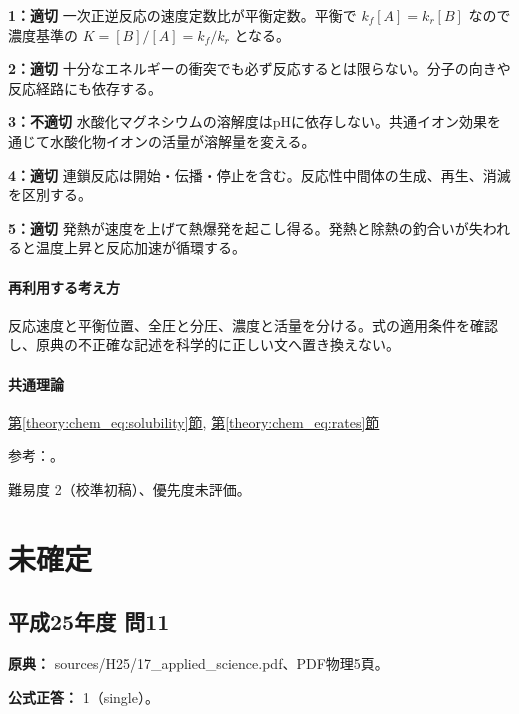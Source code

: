 \noindent\textbf{1：適切} 一次正逆反応の速度定数比が平衡定数。平衡で \(k_f[A]=k_r[B]\) なので濃度基準の \(K=[B]/[A]=k_f/k_r\) となる。\par

\noindent\textbf{2：適切} 十分なエネルギーの衝突でも必ず反応するとは限らない。分子の向きや反応経路にも依存する。\par

\noindent\textbf{3：不適切} 水酸化マグネシウムの溶解度はpHに依存しない。共通イオン効果を通じて水酸化物イオンの活量が溶解量を変える。\par

\noindent\textbf{4：適切} 連鎖反応は開始・伝播・停止を含む。反応性中間体の生成、再生、消滅を区別する。\par

\noindent\textbf{5：適切} 発熱が速度を上げて熱爆発を起こし得る。発熱と除熱の釣合いが失われると温度上昇と反応加速が循環する。\par

\paragraph{再利用する考え方} 反応速度と平衡位置、全圧と分圧、濃度と活量を分ける。式の適用条件を確認し、原典の不正確な記述を科学的に正しい文へ置き換えない。

\paragraph{共通理論} \hyperref[theory:chem_eq:solubility]{第\ref*{theory:chem_eq:solubility}節}, \hyperref[theory:chem_eq:rates]{第\ref*{theory:chem_eq:rates}節}

\par 参考：\cite{iupac_greenbook2012}。

\par 難易度 2（校準初稿）、優先度未評価。

\section{未確定}

\subsection{平成25年度 問11}
\label{q:h25-reg-applied-11}

\noindent\textbf{原典：} sources/H25/17\_applied\_science.pdf、PDF物理5頁。

\textbf{公式正答：} 1（single）。

